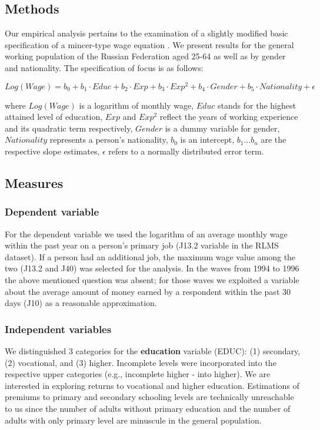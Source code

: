 \documentclass[12pt,a4paper]{article}
\numberwithin{equation}{section}
\begin{document}
\subsection{Methods}

Our empirical analysis pertains to the examination of a slightly modified basic specification of a mincer-type wage equation \parencite{mincer_082._1974}. We present results for the general working population of the Russian Federation aged 25-64 as well as by gender and nationality. The specification of focus is as follows:

$$Log(Wage) = b_0 + b_1\cdot Educ + b_2\cdot Exp + b_3\cdot Exp^2 + b_4\cdot Gender + b_5\cdot Nationality + \epsilon$$

where $Log(Wage)$ is a logarithm of monthly wage, $Educ$ stands for the highest attained level of education, $Exp$ and $Exp^2$ reflect the years of working experience and its quadratic term respectively, $Gender$ is a dummy variable for gender, $Nationality$ represents a person's nationality, $b_0$ is an intercept, $b_1 ... b_n$ are the respective slope estimates, $\epsilon$ refers to a normally distributed error term.
\\

\subsection{Measures}

\subsubsection{Dependent variable}

For the dependent variable we used the logarithm of an average monthly wage within the past year on a person's primary job (J13.2 variable in the RLMS dataset). If a person had an additional job, the maximum wage value among the two (J13.2 and J40) was selected for the analysis. In the waves from 1994 to 1996 the above mentioned question was absent; for those waves we exploited a variable about the average amount of money earned by a respondent within the past 30 days (J10) as a reasonable approximation.
\\

\subsubsection{Independent variables}

We distinguished 3 categories for the {\bf education} variable (EDUC): (1) secondary, (2) vocational, and (3) higher. Incomplete levels were incorporated into the respective upper categories (e.g., incomplete higher - into higher). We are interested in exploring returns to vocational and higher education. Estimations of premiums to primary and secondary schooling levels are technically unreachable to us since the number of adults without primary education and the number of adults with only primary level are minuscule in the general population. 
\\
\end{document}
